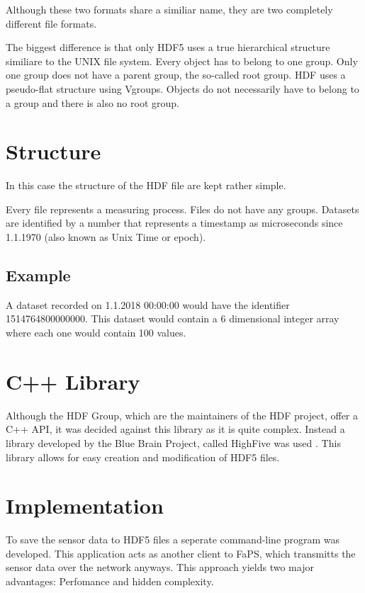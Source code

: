 Although these two formats share a similiar name, they are two completely different file formats.

The biggest difference is that only HDF5 uses a true hierarchical structure similiare to the UNIX file system. Every object has to belong to one group. Only one group does not have a parent group, the so-called root group.
HDF uses a pseudo-flat structure using Vgroups. Objects do not necessarily have to belong to a group and there is also no root group.

\section{Structure}

In this case the structure of the HDF file are kept rather simple.

Every file represents a measuring process. Files do not have any groups. Datasets are identified by a number that represents a timestamp as microseconds since 1.1.1970 (also known as Unix Time or epoch).

\subsection{Example}

A dataset recorded on 1.1.2018 00:00:00 would have the identifier 1514764800000000. This dataset would contain a 6 dimensional integer array where each one would contain 100 values.

\section {C++ Library}

Although the HDF Group, which are the maintainers of the HDF project, offer a C++ API, it was decided against this library as it is quite complex. Instead a library developed by the Blue Brain Project, called HighFive was
used \autocite{HighFive}. This library allows for easy creation and modification of HDF5 files.

\section{Implementation}

To save the sensor data to HDF5 files a seperate command-line program was developed. This application acts as another client to FaPS, which transmitts the sensor data over the network anyways. This approach yields two
major advantages: Perfomance and hidden complexity.

